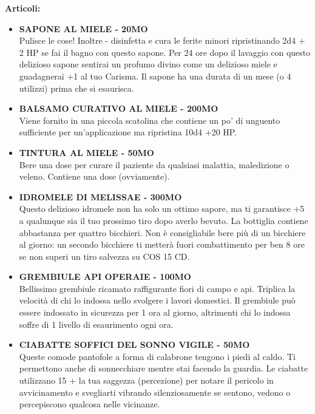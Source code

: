 \documentclass{article}
\begin{document}
\textbf{Articoli: }
\begin{itemize}
    \item \textbf{SAPONE AL MIELE - 20MO} \\
    Pulisce le cose! Inoltre - disinfetta e cura le ferite minori ripristinando 2d4 + 2 HP se fai il bagno con questo sapone. Per 24 ore dopo il lavaggio con questo delizioso sapone sentirai un profumo divino come un delizioso miele e guadagnerai +1 al tuo Carisma. Il sapone ha una durata di un mese (o 4 utilizzi) prima che si esaurisca.
    
    \item \textbf{BALSAMO CURATIVO AL MIELE - 200MO} \\
    Viene fornito in una piccola scatolina che contiene un po' di unguento sufficiente per un'applicazione ma ripristina 10d4 +20 HP.
    
    \item \textbf{TINTURA AL MIELE - 50MO} \\
    Bere una dose per curare il paziente da qualsiasi malattia, maledizione o veleno. Contiene una dose (ovviamente).
    
    \item \textbf{IDROMELE DI MELISSAE - 300MO} \\
    Questo delizioso idromele non ha solo un ottimo sapore, ma ti garantisce +5 a qualunque sia il tuo prossimo tiro dopo averlo bevuto. La bottiglia contiene abbastanza per quattro bicchieri. Non è consigliabile bere più di un bicchiere al giorno: un secondo bicchiere ti metterà fuori combattimento per ben 8 ore se non superi un tiro salvezza su COS 15 CD.
    
    \item \textbf{GREMBIULE API OPERAIE - 100MO} \\
    Bellissimo grembiule ricamato raffigurante fiori di campo e api. Triplica la velocità di chi lo indossa nello svolgere i lavori domestici. Il grembiule può essere indossato in sicurezza per 1 ora al giorno, altrimenti chi lo indossa soffre di 1 livello di esaurimento ogni ora.
    
    \item \textbf{CIABATTE SOFFICI DEL SONNO VIGILE - 50MO} \\
    Queste comode pantofole a forma di calabrone tengono i piedi al caldo. Ti permettono anche di sonnecchiare mentre stai facendo la guardia. Le ciabatte utilizzano 15 + la tua saggezza (percezione) per notare il pericolo in avvicinamento e svegliarti vibrando silenziosamente se sentono, vedono o percepiscono qualcosa nelle vicinanze.
    

\end{itemize}
\end{document}
